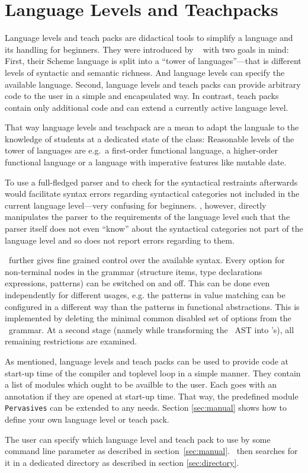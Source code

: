 
\section{Language Levels and Teachpacks}
\label{sec:teachpacks}

Language levels and teach packs are didactical tools to simplify a language and
its handling for beginners. They were introduced by \drscheme\
\citep{Felleisen98thedrscheme}  with two goals in mind: First, their Scheme language is
split into a ``tower of languages''---that is different levels of syntactic
and semantic richness. And language levels can specify the available
language. Second, language levels and teach packs can provide arbitrary code to
the user in a simple and encapsulated way. In contrast, teach packs contain only
additional code and can extend a currently active language level.

That way language levels and teachpack are a mean to adapt the languale to the
knowledge of students at a dedicated state of the class: Reasonable levels of
the tower of languages are e.g.\ a first-order functional language, a
higher-order functional language or a language with imperative features like
mutable date.

To use a full-fledged parser and to check for the syntactical restraints afterwards
would facilitate syntax errors regarding syntactical categories not included in
the current language level---very confusing for beginners. 
\easyocaml, however, directly manipulates the parser to the requirements of the
language level such that the parser itself does not even ``know'' about the
syntactical categories not part of the language level and so does not report
errors regarding to them.

\easyocaml\ further gives fine grained control over the available syntax.
Every option for non-terminal nodes in the grammar (structure items, type
declarations  expressions, patterns) can be switched on and off. This can be
done even independently for different usages, e.g. the patterns in value
matching\ttfootnote{match \dots\ with \emph{pat} -> \dots} can be configured in
a different way than the patterns in functional abstractions.
This is implemented by
deleting the minimal common disabled set of options from the \camlpf\ grammar.
At a second stage (namely while transforming the \ocaml\ AST into
\easyocaml's), all remaining restrictions are examined.

As mentioned, language levels and teach packs can be used to provide code at
start-up time of the compiler and toplevel loop in a simple manner. They contain
a list of modules which ought to be availble to the user. Each goes with an
annotation if they are opened at start-up time. That way, the predefined module
\texttt{Pervasives} can be extended to any needs.
Section \ref{sec:manual} shows how to define your own language level or teach
pack.

The user can specify which language level and teach pack to use by some command
line parameter as described in section~\ref{sec:manual}.
\easyocaml\ then searches for it in a dedicated directory as described in
section \ref{sec:directory}.

